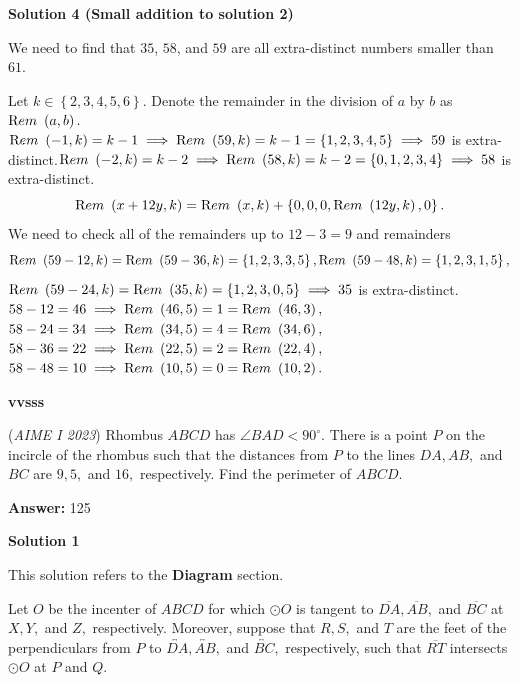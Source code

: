 \begin{enumerate}
{{\textbf{Solution 4 (Small addition to solution 2)}

We need to find that $35$, $58$, and $59$ are all extra-distinct numbers smaller than $61.$

 Let $k \in \left\{2, 3, 4, 5, 6 \right\}.$ Denote the remainder in the division of $a$ by $b$ as ${\textrm Rem} \ \left( a, b \right).$
${\textrm Rem} \ \left( -1, k \right) = k - 1 \implies {\textrm Rem} \ \left( 59, k \right) = k - 1 = \left\{1, 2, 3, 4, 5 \right\}\implies 59$ is extra-distinct.${\textrm Rem} \ \left( -2, k \right) = k - 2 \implies {\textrm Rem} \ \left( 58, k \right) = k - 2 = \left\{0, 1, 2, 3, 4 \right\} \implies 58$ is extra-distinct.
 \[{\textrm Rem} \ \left( x + 12y, k \right) = {\textrm Rem} \ \left(x, k \right) + \left\{0, 0, 0, {\textrm Rem} \ \left(12y, k \right), 0 \right\}.\]We need to check all of the remainders up to $12 - 3 = 9$ and remainders 
 \[{\textrm Rem} \ \left( 59 - 12, k \right) = {\textrm Rem} \ \left( 59 - 36, k \right) = \left\{1, 2, 3, 3, 5 \right\}, {\textrm Rem} \ \left( 59 - 48, k \right) = \left\{1, 2, 3, 1, 5 \right\},\]${\textrm Rem} \ \left( 59 - 24, k \right) ={\textrm Rem} \ \left(35, k \right) = \left\{1, 2, 3, 0, 5 \right\} \implies 35$ is extra-distinct.$58 - 12 = 46 \implies {\textrm Rem} \ \left( 46, 5 \right) = 1 = {\textrm Rem} \ \left( 46, 3 \right),$ $58 - 24 = 34 \implies {\textrm Rem} \ \left( 34, 5 \right) = 4 = {\textrm Rem} \ \left( 34, 6 \right),$ $58 - 36 = 22 \implies {\textrm Rem} \ \left( 22, 5 \right) = 2 = {\textrm Rem} \ \left( 22, 4 \right),$ $58 - 48 = 10 \implies {\textrm Rem} \ \left( 10, 5 \right) = 0 = {\textrm Rem} \ \left( 10, 2 \right).$

 \textbf{vvsss}

 


	\item (\textit{AIME I 2023}) Rhombus $ABCD$ has $\angle BAD < 90^\circ.$ There is a point $P$ on the incircle of the rhombus such that the distances from $P$ to the lines $DA,AB,$ and $BC$ are $9,5,$ and $16,$ respectively. Find the perimeter of $ABCD.$

 \textbf{Answer: }125



\textbf{Solution 1}

This solution refers to the \textbf{Diagram} section.

 Let $O$ be the incenter of $ABCD$ for which $\odot O$ is tangent to $\overline{DA},\overline{AB},$ and $\overline{BC}$ at $X,Y,$ and $Z,$ respectively. Moreover, suppose that $R,S,$ and $T$ are the feet of the perpendiculars from $P$ to $\overleftrightarrow{DA},\overleftrightarrow{AB},$ and $\overleftrightarrow{BC},$ respectively, such that $\overline{RT}$ intersects $\odot O$ at $P$ and $Q.$

}}
\end{enumerate}
